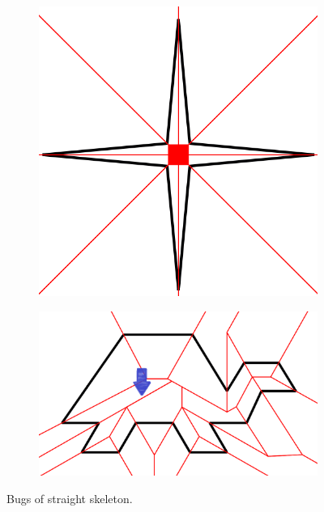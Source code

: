 \documentclass[11pt]{article}
\begin{document}
 \begin{figure}[H]
\centering
  \begin{subfigure}[b]{0.28\textwidth}
    \includegraphics[width=\textwidth]{FIGS/Part5/smallstar}
    \caption{}
    \label{fig:bug01}
  \end{subfigure}
  \begin{subfigure}[b]{0.48\textwidth}
    \includegraphics[width=\textwidth]{FIGS/Part5/turtle}
    \caption{}
     \label{fig:bug02}
  \end{subfigure}
    \caption{Bugs of straight skeleton.}
    \label{fig:bug}
\end{figure}
\end{document}
